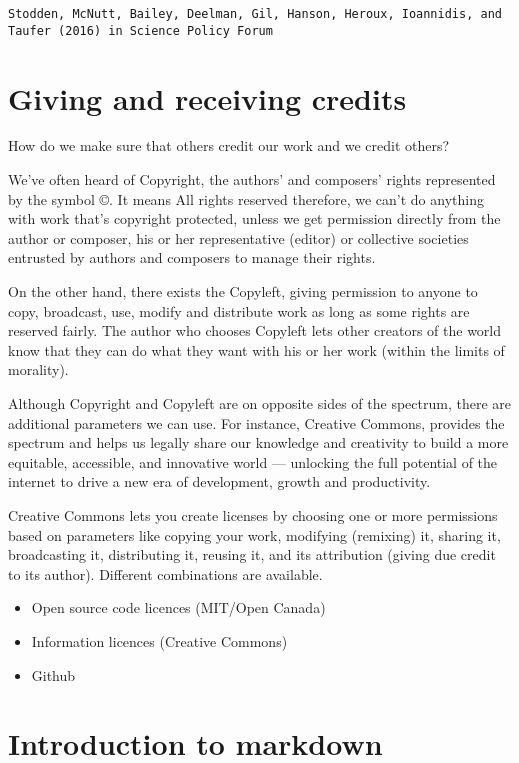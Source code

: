 \documentclass[
]{book}
\providecommand{\tightlist}{%
  \setlength{\itemsep}{0pt}\setlength{\parskip}{0pt}}
\begin{document}
\texttt{Stodden,\ McNutt,\ Bailey,\ Deelman,\ Gil,\ Hanson,\ Heroux,\ Ioannidis,\ and\ Taufer\ (2016)\ in\ Science\ Policy\ Forum}

\hypertarget{giving-and-receiving-credits}{%
\chapter{Giving and receiving credits}\label{giving-and-receiving-credits}}

How do we make sure that others credit our work and we credit others?

We've often heard of Copyright, the authors' and composers' rights represented by the symbol ©.
It means All rights reserved therefore, we can't do anything with work that's copyright protected, unless we get permission directly from the author or composer, his or her representative (editor) or collective societies entrusted by authors and composers to manage their rights.

On the other hand, there exists the Copyleft, giving permission to anyone to copy, broadcast, use, modify and distribute work as long as some rights are reserved fairly. The author who chooses Copyleft lets other creators of the world know that they can do what they want with his or her work (within the limits of morality).

Although Copyright and Copyleft are on opposite sides of the spectrum, there are additional parameters we can use. For instance, Creative Commons, provides the spectrum and helps us legally share our knowledge and creativity to build a more equitable, accessible, and innovative world --- unlocking the full potential of the internet to drive a new era of development, growth and productivity.

Creative Commons lets you create licenses by choosing one or more permissions based on parameters like copying your work, modifying (remixing) it, sharing it, broadcasting it, distributing it, reusing it, and its attribution (giving due credit to its author). Different combinations are available.

\begin{itemize}
\tightlist
\item
  Open source code licences (MIT/Open Canada)
\item
  Information licences (Creative Commons)
\item
  Github
\end{itemize}

\hypertarget{introduction-to-markdown}{%
\chapter{Introduction to markdown}\label{introduction-to-markdown}}
\end{document}
